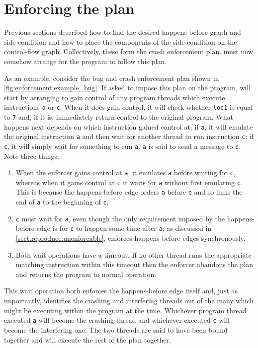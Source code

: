 \section{Enforcing the plan}
\label{sect:enforce:interpreting}

Previous sections described how to find the desired happens-before
graph and side condition and how to place the components of the side
condition on the control-flow graph.  Collectively, these form the
crash enforcement plan.  {\Technique} must now somehow arrange for the
program to follow this plan.

As an example, consider the bug and crash enforcement plan shown in
\autoref{fig:enforcement:example_bug}.  If asked to impose this plan
on the program, {\technique} will start by arranging to gain control
of any program threads which execute instructions {\tt a} or {\tt c}.
When it does gain control, it will check whether \texttt{loc1} is
equal to \texttt{7} and, if it is, immediately return control to the
original program.  What happens next depends on which instruction
{\technique} gained control at: if {\tt a}, it will emulate the
original instruction {\tt a} and then wait for another thread to run
instruction {\tt c}; if {\tt c}, it will simply wait for something to
run {\tt a}.  \texttt{a} is said to send a message to \texttt{c}.
Note three things:
\begin{enumerate}
\item When the enforcer gains control at {\tt a}, it emulates {\tt a}
  before waiting for {\tt c}, whereas when it gains control at {\tt c}
  it waits for {\tt a} without first emulating {\tt c}.  This is
  because the happens-before edge orders {\tt a} before {\tt c} and so
  links the end of {\tt a} to the beginning of {\tt c}.
\item {\tt c} must wait for {\tt a}, even though the only requirement
  imposed by the happens-before edge is for {\tt c} to happen some
  time after {\tt a}; as discussed in
  \autoref{sect:reproduce:unenforcable}, {\technique} enforces
  happens-before edges synchronously.
\item Both wait operations have a timeout.  If no other thread runs
  the appropriate matching instruction within this timeout then the
  enforcer abandons the plan and returns the program to normal
  operation.
\end{enumerate}
This wait operation both enforces the happens-before edge itself and,
just as importantly, identifies the crashing and interfering threads
out of the many which might be executing within the program at the
time.  Whichever program thread executed {\tt a} will become the
crashing thread and whichever executed {\tt c} will become the
interfering one.  The two threads are said to have been bound together
and will execute the rest of the plan together.

